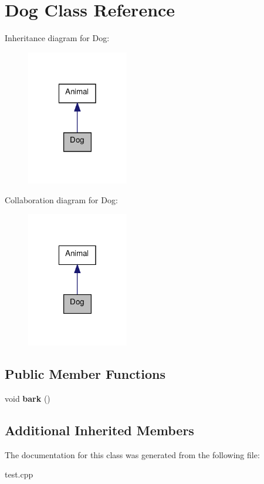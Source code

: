 \hypertarget{classDog}{\section{Dog Class Reference}
\label{classDog}
}


Inheritance diagram for Dog\+:\nopagebreak
\begin{figure}[H]
\begin{center}
\leavevmode
\includegraphics[width=126pt]{classDog__inherit__graph}
\end{center}
\end{figure}


Collaboration diagram for Dog\+:\nopagebreak
\begin{figure}[H]
\begin{center}
\leavevmode
\includegraphics[width=126pt]{classDog__coll__graph}
\end{center}
\end{figure}
\subsection*{Public Member Functions}
\begin{DoxyCompactItemize}
\item 
\hypertarget{classDog_ad3ab5661e3663948a486ff73049b1e1f}{void {\bfseries bark} ()}\label{classDog_ad3ab5661e3663948a486ff73049b1e1f}

\end{DoxyCompactItemize}
\subsection*{Additional Inherited Members}


The documentation for this class was generated from the following file\+:\begin{DoxyCompactItemize}
\item 
test.\+cpp\end{DoxyCompactItemize}
